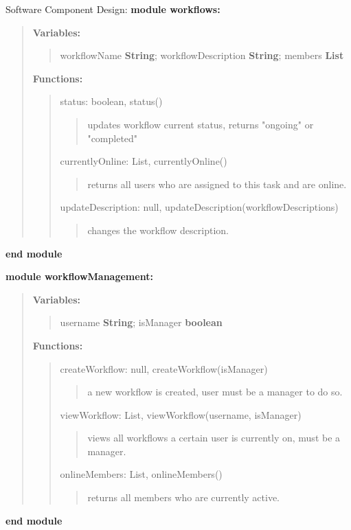 \documentclass{article}[draft]
\begin{document}
\bigbreak
\noindent Software Component Design:
\bigbreak
\noindent \textbf{module workflows:}
\begin{quote}
  \textbf{Variables:}
  \begin{quote}
    workflowName \textbf{String}; workflowDescription \textbf{String}; members \textbf{List}
  \end{quote}
  \textbf{Functions:}
  \begin{quote}

    status: boolean, status()
    \begin{quote}
      updates workflow current status, returns "ongoing" or "completed"
    \end{quote}

    currentlyOnline: List, currentlyOnline()
    \begin{quote}
      returns all users who are assigned to this task and are online.
    \end{quote}

    updateDescription: null, updateDescription(workflowDescriptions)
    \begin{quote}
     changes the workflow description.
    \end{quote}
  \end{quote}
\end{quote}
\textbf{end module}
\bigbreak

\noindent \textbf{module workflowManagement:}
\begin{quote}
  \textbf{Variables:}
  \begin{quote}
    username \textbf{String}; isManager \textbf{boolean}
  \end{quote}

  \textbf{Functions:}
  \begin{quote}

    createWorkflow: null, createWorkflow(isManager)
    \begin{quote}
      a new workflow is created, user must be a manager to do so.
    \end{quote}

    viewWorkflow: List, viewWorkflow(username, isManager)
    \begin{quote}
      views all workflows a certain user is currently on, must be a manager.
    \end{quote}

    onlineMembers: List, onlineMembers()
    \begin{quote}
      returns all members who are currently active.
    \end{quote}

  \end{quote}
\end{quote}
\textbf{end module}
\bigbreak
\end{document}
